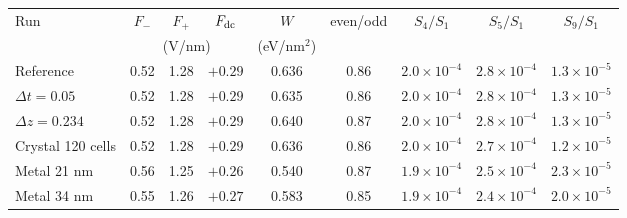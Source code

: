 \begin{tabular}{lcccccccc}
\hline\hline
Run & $F_-$ & $F_+$ & $F_{\rm dc}$ & $W$ & even/odd & $S_4/S_1$ & $S_5/S_1$ & $S_9/S_1$ \\
 & \multicolumn{3}{c}{(V/nm)} & (eV/nm$^2$) & & & & \\
\hline
Reference & 0.52 & 1.28 & $+0.29$ & 0.636 & 0.86 & $2.0\times10^{-4}$ & $2.8\times10^{-4}$ & $1.3\times10^{-5}$ \\
$\Delta t=0.05$ & 0.52 & 1.28 & $+0.29$ & 0.635 & 0.86 & $2.0\times10^{-4}$ & $2.8\times10^{-4}$ & $1.3\times10^{-5}$ \\
$\Delta z=0.234$ & 0.52 & 1.28 & $+0.29$ & 0.640 & 0.87 & $2.0\times10^{-4}$ & $2.8\times10^{-4}$ & $1.3\times10^{-5}$ \\
Crystal 120 cells & 0.52 & 1.28 & $+0.29$ & 0.636 & 0.86 & $2.0\times10^{-4}$ & $2.7\times10^{-4}$ & $1.2\times10^{-5}$ \\
Metal 21 nm & 0.56 & 1.25 & $+0.26$ & 0.540 & 0.87 & $1.9\times10^{-4}$ & $2.5\times10^{-4}$ & $2.3\times10^{-5}$ \\
Metal 34 nm & 0.55 & 1.26 & $+0.27$ & 0.583 & 0.85 & $1.9\times10^{-4}$ & $2.4\times10^{-4}$ & $2.0\times10^{-5}$ \\
\hline\hline
\end{tabular}
